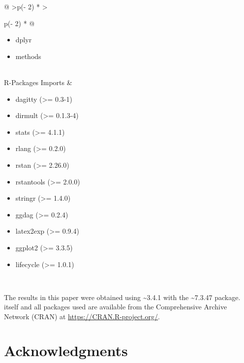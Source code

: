 \documentclass[
  11pt,
  article]{jss}
\providecommand{\tightlist}{%
  \setlength{\itemsep}{0pt}\setlength{\parskip}{0pt}}\usepackage{longtable,booktabs,array}
\begin{document}
\begin{longtable}[]{@{}
  >{\raggedleft\arraybackslash}p{(\columnwidth - 2\tabcolsep) * }
  >{\raggedright\arraybackslash}p{(\columnwidth - 2\tabcolsep) * }@{}}
\begin{minipage}[t]{\linewidth}
\begin{itemize}
\tightlist
\item
  dplyr
\item
  methods
\end{itemize}
\end{minipage} \\
R-Packages Imports & \begin{minipage}[t]{\linewidth}\raggedright
\begin{itemize}
\tightlist
\item
  dagitty (\textgreater= 0.3-1)
\item
  dirmult (\textgreater= 0.1.3-4)
\item
  stats (\textgreater= 4.1.1)
\item
  rlang (\textgreater= 0.2.0)
\item
  rstan (\textgreater= 2.26.0)
\item
  rstantools (\textgreater= 2.0.0)
\item
  stringr (\textgreater= 1.4.0)
\item
  ggdag (\textgreater= 0.2.4)
\item
  latex2exp (\textgreater= 0.9.4)
\item
  ggplot2 (\textgreater= 3.3.5)
\item
  lifecycle (\textgreater= 1.0.1)
\end{itemize}
\end{minipage} \\
\end{longtable}

The results in this paper were obtained using
\textasciitilde3.4.1 with the
\textasciitilde7.3.47 package.  itself and all
packages used are available from the Comprehensive  Archive
Network (CRAN) at \url{https://CRAN.R-project.org/}.

\section*{Acknowledgments}\label{acknowledgments}
\end{document}
